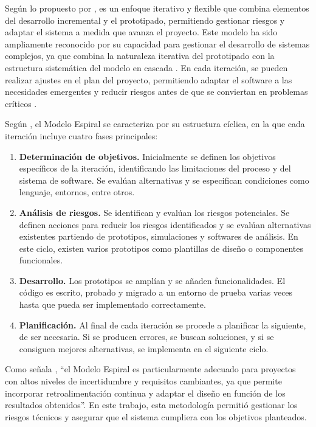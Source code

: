 Según lo propuesto por \citeauthor{boehm_spiral_1988} \citeyear{boehm_spiral_1988}, es un enfoque iterativo y flexible que combina elementos del desarrollo incremental y el prototipado, permitiendo gestionar riesgos y adaptar el sistema a medida que avanza el proyecto. Este modelo ha sido ampliamente reconocido por su capacidad para gestionar el desarrollo de sistemas complejos, ya que combina la naturaleza iterativa del prototipado con la estructura sistemática del modelo en cascada \cite[p. 39]{pressman_ingenieria_2010}. En cada iteración, se pueden realizar ajustes en el plan del proyecto, permitiendo adaptar el software a las necesidades emergentes y reducir riesgos antes de que se conviertan en problemas críticos \cite[p. 40]{pressman_ingenieria_2010}.

Según \citeauthor{boehm_spiral_1988} \citeyear{boehm_spiral_1988}, el Modelo Espiral se caracteriza por su estructura cíclica, en la que cada iteración incluye cuatro fases principales:

\begin{enumerate}
  \item \textbf{Determinación de objetivos.} Inicialmente se definen los objetivos específicos de la iteración, identificando las limitaciones del proceso y del sistema de software. Se evalúan alternativas y se especifican condiciones como lenguaje, entornos, entre otros.
  \item \textbf{Análisis de riesgos.} Se identifican y evalúan los riesgos potenciales. Se definen acciones para reducir los riesgos identificados y se evalúan alternativas existentes partiendo de prototipos, simulaciones y softwares de análisis. En este ciclo, existen varios prototipos como plantillas de diseño o componentes funcionales.
  \item \textbf{Desarrollo.} Los prototipos se amplían y se añaden funcionalidades. El código es escrito, probado y migrado a un entorno de prueba varias veces hasta que pueda ser implementado correctamente.
  \item \textbf{Planificación.} Al final de cada iteración se procede a planificar la siguiente, de ser necesaria. Si se producen errores, se buscan soluciones, y si se consiguen mejores alternativas, se implementa en el siguiente ciclo.
\end{enumerate}

Como señala \citeauthor{boehm_spiral_1988} \citeyear{boehm_spiral_1988}, ``el Modelo Espiral es particularmente adecuado para proyectos con altos niveles de incertidumbre y requisitos cambiantes, ya que permite incorporar retroalimentación continua y adaptar el diseño en función de los resultados obtenidos”. En este trabajo, esta metodología permitió gestionar los riesgos técnicos y asegurar que el sistema cumpliera con los objetivos planteados.

